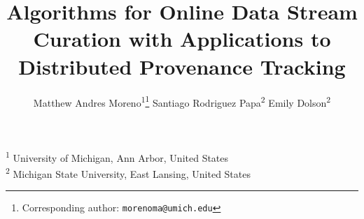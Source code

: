 \title{ Algorithms for Online Data Stream Curation with Applications to Distributed Provenance Tracking  }
\author{
    Matthew Andres Moreno\textsuperscript{1}\thanks{Corresponding author: \texttt{morenoma@umich.edu}} \quad
    Santiago Rodriguez Papa\textsuperscript{2} \quad
    Emily Dolson\textsuperscript{2}
}
\date{}

\newcommand{\affil}[1]{\textsuperscript{#1}}
\newcommand{\affiliations}{
    \affil{1} University of Michigan, Ann Arbor, United States \\
    \affil{2} Michigan State University, East Lansing, United States
}

\maketitle

\begin{center}
\affiliations
\end{center}


